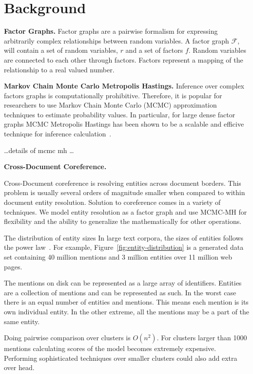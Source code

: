 
\section{Background}

\textbf{Factor Graphs.}
Factor graphs are a pairwise formalism for expressing arbitrarily complex
relationships between random variables.
A factor graph $\mathcal{F}$, will contain a set of random variables, $r$
and a set of factors $f$. Random variables are connected to each other
through factors. Factors represent a mapping of the relationship to a 
real valued number.


\textbf{Markov Chain Monte Carlo Metropolis Hastings.}
Inference over complex factors graphs is computationally prohibitive.
Therefore, it is popular for researchers to use Markov Chain Monte Carlo (MCMC) 
approximation techniques to estimate probability values.
In particular, for large dense factor graphs MCMC Metropolis Hastings has
been shown to be a scalable and efficive technique for 
inference calculation~\cite{singh2011large}.

\ldots details of mcmc mh \ldots



\textbf{Cross-Document Coreference.}

Cross-Document coreference is resolving entities across document borders.
This problem is usually several orders of magnitude smaller when compared to within document entity resolution.
Solution to coreference comes in a variety of techniques.
We model entity resolution as a factor graph and use MCMC-MH for flexibility and the ability
to generalize the mathematically for other operations.

The distribution of entity sizes
In large text corpora, the sizes of entities follows the power law~\cite{singh12:wiki-links}.
For example, Figure~\ref{fig:entity-distribution} is a generated data set containing
40 million mentions and 3 million entities over 11 million web pages.

The mentions on disk can be represented as a large array of identifiers.
Entities are a collection of mentions and  can be represented as such.
In the worst case there is an equal number of entities and mentions.
This means each mention is its own individual entity.
In the other extreme, all the mentions may be a part of the same entity.


Doing pairwise comparison over clusters is $O(n^2)$.
For clusters larger than 1000 mentions calculating scores of the model
becomes extremely expensive.
Performing sophisticated techniques over smaller clusters could also 
add extra over head.

